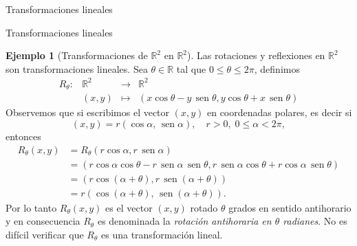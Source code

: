 \documentclass[a4paper,12pt,twoside,spanish,reqno]{amsbook}
\numberwithin{equation}{section}
\theoremstyle{definition}
\newtheorem{ejemplo}[teorema]{Ejemplo}
\theoremstyle{remark}
\renewcommand{\sin}{{\,\operatorname{sen}}}
\newcommand{\R}{\mathbb R}
\begin{document}
\begin{chapter}{Transformaciones lineales}
\begin{section}{Transformaciones lineales}
            
            \begin{ejemplo}[{\sc Transformaciones de $\R^2$ en $\R^2$}] Las rotaciones y reflexiones en $\R^2$ son transformaciones lineales. Sea $\theta \in \R$ tal que  $0 \le \theta \le 2\pi$,  definimos
                \begin{equation*}
                    \begin{array}{llll}
                    R_\theta:&\R^2 &\to &\R^2 \\
                    &(x,y) &\mapsto & (x \cos\theta - y \sin\theta, y\cos\theta+ x\sin\theta)
                    \end{array}
                \end{equation*}
                Observemos que si escribimos el vector $(x,y)$  en coordenadas polares,  es decir  si 
                $$
                (x,y)= r(\cos\alpha,\sin\alpha),\quad r> 0, \; 0 \le \alpha < 2\pi, 
                $$
                entonces
                \begin{align*}
                    R_\theta(x,y) &= R_\theta(r\cos\alpha,r\sin\alpha) \\
                    &= (r\cos\alpha \cos\theta - r\sin\alpha \sin\theta, r\sin\alpha\cos\theta+ r\cos\alpha\sin\theta) \\
                    &= (r\cos(\alpha+\theta) , r\sin(\alpha+\theta)) \\
                    &= r(\cos(\alpha+\theta) , \sin(\alpha+\theta)).
                \end{align*}
                Por lo tanto $R_\theta(x,y)$ es el vector $(x,y)$ rotado $\theta$ grados en sentido antihorario y en consecuencia  $R_\theta$ es denominada la \textit{rotación antihoraria en $\theta$ radianes}. No es difícil verificar que $R_\theta$ es una transformación lineal. 
                

\end{ejemplo}
\end{section}
\end{chapter}
\end{document}
